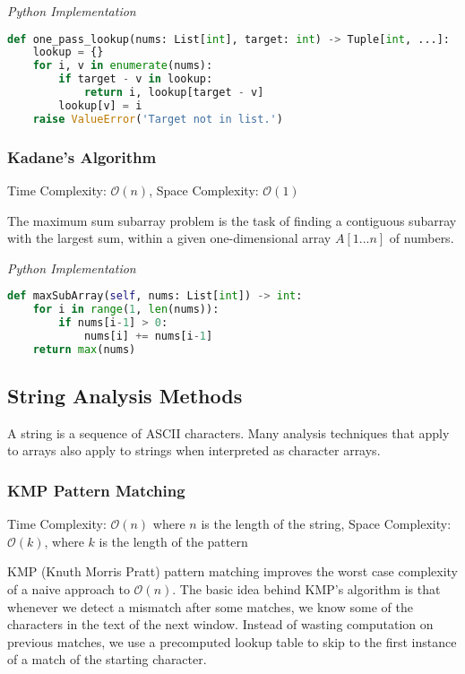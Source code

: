 \documentclass{article}
\newcommand{\bigO}{\ensuremath{\mathcal{O}}}
\begin{document}
\vspace{8pt} \emph{Python Implementation}
\begin{lstlisting}[language=Python]
def one_pass_lookup(nums: List[int], target: int) -> Tuple[int, ...]:
    lookup = {}
    for i, v in enumerate(nums):
        if target - v in lookup:
            return i, lookup[target - v]
        lookup[v] = i
    raise ValueError('Target not in list.')
\end{lstlisting}
    
    \subsubsection{Kadane's Algorithm}
    Time Complexity: $\bigO(n)$, Space Complexity: $\bigO(1)$
    
    The maximum sum subarray problem is the task of finding a contiguous subarray with the largest sum, within a given one-dimensional array $A[1...n]$ of numbers.
    
\vspace{8pt} \emph{Python Implementation}
\begin{lstlisting}[language=Python]
def maxSubArray(self, nums: List[int]) -> int:
    for i in range(1, len(nums)):
        if nums[i-1] > 0:
            nums[i] += nums[i-1]
    return max(nums)
\end{lstlisting}
    
    \subsection{String Analysis Methods}
    A string is a sequence of ASCII characters. Many analysis techniques that apply to arrays also apply to strings when interpreted as character arrays.
    
    \subsubsection{KMP Pattern Matching}
    Time Complexity: $\bigO(n)$ where $n$ is the length of the string, Space Complexity: $\bigO(k)$, where $k$ is the length of the pattern
    
    KMP (Knuth Morris Pratt) pattern matching improves the worst case complexity of a naive approach to $\bigO(n)$. The basic idea behind KMP’s algorithm is that whenever we detect a mismatch after some matches, we know some of the characters in the text of the next window. Instead of wasting computation on previous matches, we use a precomputed lookup table to skip to the first instance of a match of the starting character.
\end{document}
